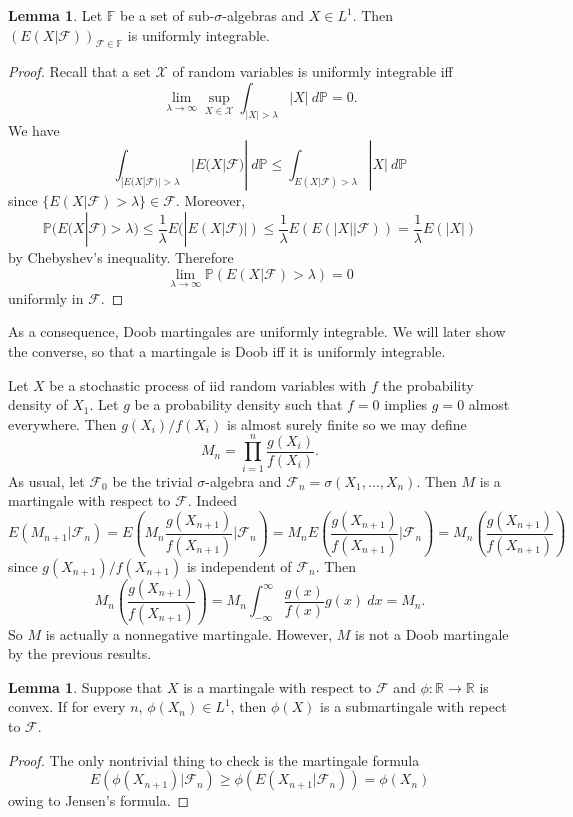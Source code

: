 \documentclass[12pt]{book}
\newcommand{\RR}{\mathbb{R}}
\newcommand{\PP}{\mathbb{P}}
\theoremstyle{definition}
\newtheorem{lemma}[theorem]{Lemma}
\newenvironment{example}
  {\pushQED{\qed}\renewcommand{\qedsymbol}{$\diamondsuit$}\examplex}
  {\popQED\endexamplex}
\begin{document}
\begin{lemma}
Let $\mathbb F$ be a set of sub-$\sigma$-algebras and $X \in L^1$.
Then $(E(X|\mathcal F))_{\mathcal F \in \mathbb F}$ is uniformly integrable.
\end{lemma}
\begin{proof}
Recall that a set $\mathcal X$ of random variables is uniformly integrable iff
$$\lim_{\lambda \to \infty} \sup_{X \in \mathcal X} \int_{|X| > \lambda} |X| ~d\PP = 0.$$
We have
$$\int_{|E(X|\mathcal F)| > \lambda} |E(X|\mathcal F)| ~d\PP \leq \int_{E(X|\mathcal F) > \lambda} |X| ~d\PP$$
since $\{E(X|\mathcal F) > \lambda\} \in \mathcal F$.
Moreover,
$$\PP(E(X|\mathcal F) > \lambda) \leq \frac{1}{\lambda} E(|E(X|\mathcal F)|)
\leq \frac{1}{\lambda} E(E(|X||\mathcal F))
= \frac{1}{\lambda} E(|X|)
$$
by Chebyshev's inequality.
Therefore
$$\lim_{\lambda \to \infty} \PP(E(X|\mathcal F) > \lambda) = 0$$
uniformly in $\mathcal F$.
\end{proof}

As a consequence, Doob martingales are uniformly integrable.
We will later show the converse, so that a martingale is Doob iff it is uniformly integrable.

\begin{example}
Let $X$ be a stochastic process of iid random variables with $f$ the probability density of $X_1$.
Let $g$ be a probability density such that $f = 0$ implies $g = 0$ almost everywhere.
Then $g(X_i)/f(X_i)$ is almost surely finite so we may define
$$M_n = \prod_{i=1}^n \frac{g(X_i)}{f(X_i)}.$$
As usual, let $\mathcal F_0$ be the trivial $\sigma$-algebra and $\mathcal F_n = \sigma(X_1, \dots, X_n)$.
Then $M$ is a martingale with respect to $\mathcal F$. Indeed
$$E(M_{n+1}|\mathcal F_n) = E(M_n \frac{g(X_{n+1})}{f(X_{n+1})}|\mathcal F_n) = M_n E(\frac{g(X_{n+1})}{f(X_{n+1})}|\mathcal F_n) = M_n (\frac{g(X_{n+1})}{f(X_{n+1})})$$
since $g(X_{n+1})/f(X_{n+1})$ is independent of $\mathcal F_n$. Then
$$M_n (\frac{g(X_{n+1})}{f(X_{n+1})}) = M_n \int_{-\infty}^\infty \frac{g(x)}{f(x)} g(x) ~dx = M_n.$$
So $M$ is actually a nonnegative martingale.
However, $M$ is not a Doob martingale by the previous results.
\end{example}

\begin{lemma}
Suppose that $X$ is a martingale with respect to $\mathcal F$ and $\phi: \RR \to \RR$ is convex.
If for every $n$, $\phi(X_n) \in L^1$, then $\phi(X)$ is a submartingale with repect to $\mathcal F$.
\end{lemma}
\begin{proof}
The only nontrivial thing to check is the martingale formula
$$
E(\phi(X_{n+1})|\mathcal F_n) \geq \phi(E(X_{n+1}|\mathcal F_n)) = \phi(X_n)
$$
owing to Jensen's formula.
\end{proof}
\end{document}
